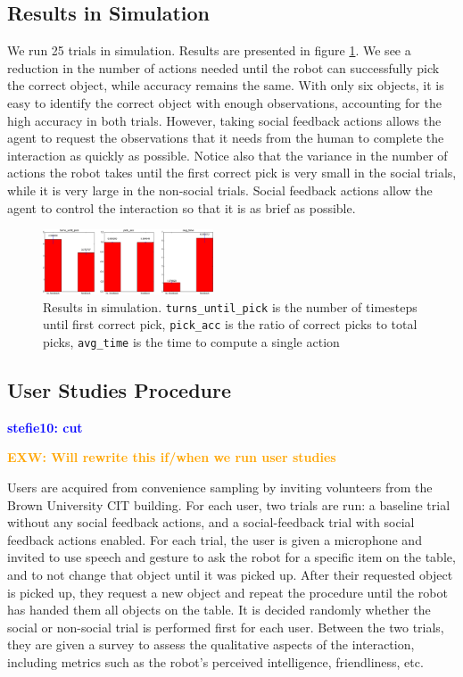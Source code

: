 \documentclass[conference]{IEEEtran}
\newcommand{\exwnote}[1]{\textcolor{orange}{\textbf{EXW: #1}}}
\newcommand{\stnote}[1]{\textcolor{blue}{\textbf{stefie10: #1}}}
\begin{document}
\subsection{Results in Simulation}

We run 25 trials in simulation. Results are presented in figure \ref{fig:toyresults}. We see a reduction in the number of actions needed until the robot can successfully pick the correct object, while accuracy remains the same. With only six objects, it is easy to identify the correct object with enough observations, accounting for the high accuracy in both trials. However, taking social feedback actions allows the agent to request the observations that it needs from the human to complete the interaction as quickly as possible. Notice also that the variance in the number of actions the robot takes until the first correct pick is very small in the social trials, while it is very large in the non-social trials. Social feedback actions allow the agent to control the interaction so that it is as brief as possible. 

\begin{figure}[H]
\begin{center}
	\includegraphics[width=0.45\textwidth]{resources/results}
\end{center}
\caption{Results in simulation. \texttt{turns\_until\_pick} is the number of timesteps until first correct pick,  \texttt{pick\_acc} is the ratio of correct picks to total picks, \texttt{avg\_time} is the time to compute a single action}
	\label{fig:toyresults}
\end{figure}


\subsection{User Studies Procedure}
\stnote{cut}

\exwnote{Will rewrite this if/when we run user studies}

Users are acquired from convenience sampling by inviting volunteers from the Brown University CIT building. For each user, two trials are run: a baseline trial without any social feedback actions, and a social-feedback trial with social feedback actions enabled. For each trial, the user is given a microphone and invited to use speech and gesture to ask the robot for a specific item on the table, and to not change that object until it was picked up. After their requested object is picked up, they request a new object and repeat the procedure until the robot has handed them all objects on the table. It is decided randomly whether the social or non-social trial is performed first for each user. Between the two trials, they are given a survey to assess the qualitative aspects of the interaction, including metrics such as the robot's perceived intelligence, friendliness, etc. 
\end{document}
